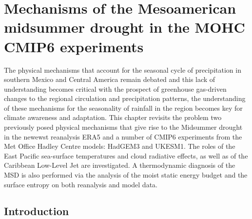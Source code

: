 
\chapter{\label{ch:5-msd}Mechanisms of the Mesoamerican midsummer drought in the MOHC CMIP6 experiments}


The physical mechanisms that account for the seasonal cycle of precipitation in southern Mexico and Central America remain debated and this lack of understanding becomes critical with the prospect of greenhouse gas-driven changes to the regional circulation and precipitation patterns, the understanding of these mechanisms for the seasonality of rainfall in the region becomes key for climate awareness and adaptation. 
This chapter revisits the problem two previously posed physical mechanisms that give rise to the Midsummer drought in the newewst reanalysis ERA5 and a number of CMIP6 experiments from the Met Office Hadley Centre models: HadGEM3 and UKESM1. 
The roles of the East Pacific sea-surface temperatures and cloud radiative effects, as well as of the Caribbean Low-Level Jet are investigated. 
A thermodynamic diagnosis of the MSD is also performed via the analysis of the moist static energy budget and the surface entropy on both reanalysis and model data. 

\section{Introduction}

